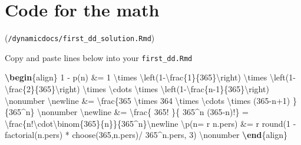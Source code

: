 \documentclass[
]{book}
\newenvironment{Shaded}{\begin{snugshade}}{\end{snugshade}}
\newcommand{\ExtensionTok}[1]{#1}
\newcommand{\KeywordTok}[1]{\textcolor[rgb]{0.13,0.29,0.53}{\textbf{#1}}}
\newcommand{\NormalTok}[1]{#1}
\newcommand{\SpecialCharTok}[1]{\textcolor[rgb]{0.00,0.00,0.00}{#1}}
\newcommand{\SpecialStringTok}[1]{\textcolor[rgb]{0.31,0.60,0.02}{#1}}
\begin{document}
\hypertarget{code-for-the-math}{%
\section{Code for the math}\label{code-for-the-math}}

(\texttt{/dynamicdocs/first\_dd\_solution.Rmd})

Copy and paste lines below into your \texttt{first\_dd.Rmd}

\begin{Shaded}
\begin{Highlighting}[]
\KeywordTok{\textbackslash{}begin}\NormalTok{\{}\ExtensionTok{align}\NormalTok{\}}\SpecialStringTok{ }
\SpecialStringTok{ 1 {-}  p(n) \&= 1 }\SpecialCharTok{\textbackslash{}times}\SpecialStringTok{ }\SpecialCharTok{\textbackslash{}left}\SpecialStringTok{(1{-}}\SpecialCharTok{\textbackslash{}frac}\SpecialStringTok{\{1\}\{365\}}\SpecialCharTok{\textbackslash{}right}\SpecialStringTok{) }\SpecialCharTok{\textbackslash{}times}
\SpecialStringTok{              }\SpecialCharTok{\textbackslash{}left}\SpecialStringTok{(1{-}}\SpecialCharTok{\textbackslash{}frac}\SpecialStringTok{\{2\}\{365\}}\SpecialCharTok{\textbackslash{}right}\SpecialStringTok{) }\SpecialCharTok{\textbackslash{}times}\SpecialStringTok{ }\SpecialCharTok{\textbackslash{}cdots}\SpecialStringTok{ }\SpecialCharTok{\textbackslash{}times}
\SpecialStringTok{              }\SpecialCharTok{\textbackslash{}left}\SpecialStringTok{(1{-}}\SpecialCharTok{\textbackslash{}frac}\SpecialStringTok{\{n{-}1\}\{365\}}\SpecialCharTok{\textbackslash{}right}\SpecialStringTok{) }\SpecialCharTok{\textbackslash{}nonumber}\SpecialStringTok{  }\SpecialCharTok{\textbackslash{}newline}
\SpecialStringTok{           \&= }\SpecialCharTok{\textbackslash{}frac}\SpecialStringTok{\{365 }\SpecialCharTok{\textbackslash{}times}\SpecialStringTok{ 364 }\SpecialCharTok{\textbackslash{}times}\SpecialStringTok{ }\SpecialCharTok{\textbackslash{}cdots}\SpecialStringTok{ }\SpecialCharTok{\textbackslash{}times}\SpecialStringTok{ (365{-}n+1) \}\{365\^{}n\} }\SpecialCharTok{\textbackslash{}nonumber}\SpecialStringTok{ }\SpecialCharTok{\textbackslash{}newline}
\SpecialStringTok{           \&= }\SpecialCharTok{\textbackslash{}frac}\SpecialStringTok{\{ 365! \}\{ 365\^{}n (365{-}n)!\} = }\SpecialCharTok{\textbackslash{}frac}\SpecialStringTok{\{n!}\SpecialCharTok{\textbackslash{}cdot\textbackslash{}binom}\SpecialStringTok{\{365\}\{n\}\}\{365\^{}n\}}\SpecialCharTok{\textbackslash{}newline}
\SpecialCharTok{\textbackslash{}p}\SpecialStringTok{(n= \textasciigrave{}r n.pers\textasciigrave{}) \&= \textasciigrave{}r  round(1 {-} factorial(n.pers) * }
\SpecialStringTok{                          choose(365,n.pers)/ 365\^{}n.pers, 3)\textasciigrave{}  }\SpecialCharTok{\textbackslash{}nonumber}
\KeywordTok{\textbackslash{}end}\NormalTok{\{}\ExtensionTok{align}\NormalTok{\}}
\end{Highlighting}
\end{Shaded}
\end{document}
